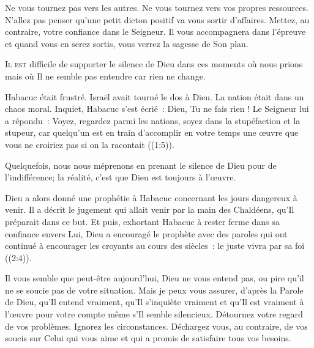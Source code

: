 Ne vous tournez pas vers les autres. Ne vous tournez vers vos propres
 ressources. N'allez pas penser qu'une petit dicton positif va vous sortir
 d'affaires. Mettez, au contraire, votre confiance dans le Seigneur.
 Il vous accompagnera dans l'épreuve et quand vous en serez sortis,
 vous verrez la sagesse de Son plan. 

\dvrule






\lettrine{I}{l est} difficile de supporter le silence de Dieu
 \ocadr dans ces moments où nous prions mais où Il ne semble pas
 entendre car rien ne change. 

Habacuc était frustré. Israël avait tourné le dos à Dieu.
 La nation était dans un chaos moral. Inquiet, Habacuc s'est écrié~: 
 \Og Dieu, Tu ne fais rien ! \Fg{} 
 Le Seigneur lui a répondu~: \Og Voyez, regardez parmi les nations,
 soyez dans la stupéfaction et la stupeur, car quelqu'un est en train
 d'accomplir en votre temps une \oe{}uvre que vous ne croiriez pas
 si on la racontait \Fg{} ((1:5)).


Quelquefois, nous nous méprenons en prenant le silence de Dieu
 pour de l'indifférence; la réalité, c'est que Dieu est toujours à l'\oe{}uvre. 

Dieu a alors donné une prophétie à Habacuc concernant les jours dangereux
 à venir. Il a décrit le jugement qui allait venir par la main des Chaldéens,
 qu'Il préparait dans ce but. Et puis, exhortant Habacuc à rester ferme
 dans sa confiance envers Lui, Dieu a encouragé le prophète avec des paroles
 qui ont continué à encourager les croyants au cours des siècles~:
 \Og le juste vivra par sa foi \Fg{} ((2:4)). 

Il vous semble que peut-être aujourd'hui, Dieu ne vous entend pas, ou pire
 \ocadr qu'il ne se soucie pas de votre situation. Mais je peux vous assurer,
 d'après la Parole de Dieu, qu'Il entend vraiment,
 qu'Il s'inquiète vraiment et qu'Il est vraiment à l'\oe{}uvre pour votre compte
 \ocadr même s'Il semble silencieux. Détournez votre regard de vos problèmes.
 Ignorez les circonstances. Déchargez vous, au contraire, de vos soucis
 sur Celui qui vous aime et qui a promis de satisfaire tous vos besoins. 


